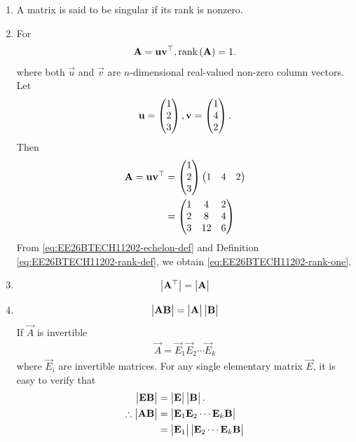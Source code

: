 \begin{enumerate}[label=\thesubsection.\arabic*, ref=\thesubsection.\theenumi]
	\label{eq:EE26BTECH11202-rank-def}
\item A matrix is said to be singular if its rank is nonzero.
	\label{eq:EE26BTECH11202-singular-def}
\item For
	\begin{align}
			\label{eq:EE26BTECH11202-rank-one}
		\mathbf{A} = \mathbf{uv}^{\top}, \text{rank}\left(\mathbf{A}\right) = 1.
\end{align}
	 where both $\vec{u}$ and $\vec{v}$ are $n$-dimensional real-valued non-zero column vectors. 
	 \\
	 \solution 
	 Let
\begin{align}
\mathbf{u} = \begin{pmatrix}1 \\ 2 \\ 3\end{pmatrix}, \mathbf{v} = \begin{pmatrix}1 \\ 4 \\ 2\end{pmatrix}.
\end{align}
Then
\begin{align}
\mathbf{A} = \mathbf{uv}^{\top} &= \begin{pmatrix}1 \\ 2 \\ 3\end{pmatrix} \begin{pmatrix}1 & 4 & 2\end{pmatrix} 
\\
			  &= \begin{pmatrix}
1 & 4 & 2 \\
2 & 8 & 4 \\
3 & 12 & 6
\end{pmatrix}
\end{align}
	From \eqref{eq:EE26BTECH11202-echelon-def}
	and Definition
	\ref{eq:EE26BTECH11202-rank-def},
	we obtain
			\eqref{eq:EE26BTECH11202-rank-one}.
	\item 
	\begin{align}
	\begin{vmatrix}\mathbf{A^{\top}}\end{vmatrix} = \begin{vmatrix}\mathbf{A}\end{vmatrix} \label{eq:EE26BTECH11202-Matrices_1} 
	\end{align}
\item 
	\begin{align}
	\begin{vmatrix}\mathbf{AB}\end{vmatrix} = \begin{vmatrix}\mathbf{A}\end{vmatrix}\begin{vmatrix}\mathbf{B}\end{vmatrix} 
	\end{align}
\solution
If $\vec{A}$ is invertible 
\begin{align}
\vec{A} = \vec{E}_1 \vec{E}_2 \cdots \vec{E}_k
\end{align}
where $\vec{E}_i$ are invertible matrices.
For any single elementary matrix $\vec{E}$, it is easy to verify that  
\begin{align}
	\mydet{\vec{E}\vec{B}} &= \mydet{\vec{E}}\mydet{\vec{B}}.
\\
\therefore
\mydet{\vec{A}\vec{B}} &= \mydet{\vec{E}_1 \vec{E}_2 \cdots \vec{E}_k \vec{B}} \\
&= \mydet{\vec{E}_1} \mydet{\vec{E}_2 \cdots \vec{E}_k \vec{B}} \\

\end{align}
\end{enumerate}
